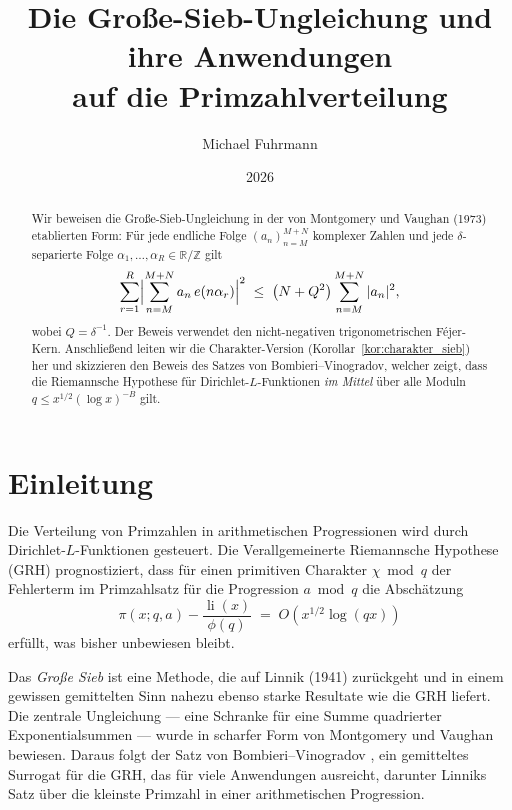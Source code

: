 \documentclass[12pt,a4paper]{amsart}
\theoremstyle{definition}
\newcommand{\Z}{\mathbb{Z}}
\newcommand{\R}{\mathbb{R}}
\DeclareMathOperator{\li}{li}
\newcommand{\eexp}[1]{e\!\left(#1\right)}
\begin{document}

\title{Die Große-Sieb-Ungleichung und ihre Anwendungen\\
       auf die Primzahlverteilung}

\author{Michael Fuhrmann}
\address{Specialist Mathematics Project, Build 56}
\date{2026}

\begin{abstract}
Wir beweisen die Große-Sieb-Ungleichung in der von Montgomery und Vaughan
(1973) etablierten Form: Für jede endliche Folge $(a_n)_{n=M}^{M+N}$
komplexer Zahlen und jede $\delta$-separierte Folge
$\alpha_1,\ldots,\alpha_R \in \R/\Z$ gilt
\[
  \sum_{r=1}^{R}\Bigl|\sum_{n=M}^{M+N} a_n\,\eexp{n\alpha_r}\Bigr|^{2}
  \;\leq\;
  \bigl(N + Q^{2}\bigr)\sum_{n=M}^{M+N}|a_n|^{2},
\]
wobei $Q = \delta^{-1}$.  Der Beweis verwendet den nicht-negativen
trigonometrischen Féjer-Kern.  Anschließend leiten
wir die Charakter-Version (Korollar~\ref{kor:charakter_sieb}) her und
skizzieren den Beweis des Satzes von Bombieri--Vinogradov, welcher zeigt,
dass die Riemannsche Hypothese für Dirichlet-$L$-Funktionen \emph{im Mittel}
über alle Moduln $q \leq x^{1/2}(\log x)^{-B}$ gilt.
\end{abstract}

\maketitle
\tableofcontents

\section{Einleitung}

Die Verteilung von Primzahlen in arithmetischen Progressionen wird durch
Dirichlet-$L$-Funktionen gesteuert.  Die Verallgemeinerte Riemannsche
Hypothese (GRH) prognostiziert, dass für einen primitiven Charakter
$\chi \bmod q$ der Fehlerterm im Primzahlsatz für die Progression
$a \bmod q$ die Abschätzung
\[
  \pi(x;q,a) - \frac{\li(x)}{\phi(q)}
  \;=\; O\!\left(x^{1/2}\log(qx)\right)
\]
erfüllt, was bisher unbewiesen bleibt.

Das \emph{Große Sieb} ist eine Methode, die auf Linnik (1941) zurückgeht und
in einem gewissen gemittelten Sinn nahezu ebenso starke Resultate wie die GRH
liefert.  Die zentrale Ungleichung --- eine Schranke für eine Summe quadrierter
Exponentialsummen --- wurde in scharfer Form von Montgomery und Vaughan
\cite{MV1973} bewiesen.  Daraus folgt der Satz von Bombieri--Vinogradov
\cite{Bombieri1965}, ein gemitteltes Surrogat für die GRH, das für viele
Anwendungen ausreicht, darunter Linniks Satz über die kleinste Primzahl in
einer arithmetischen Progression.
\end{document}
